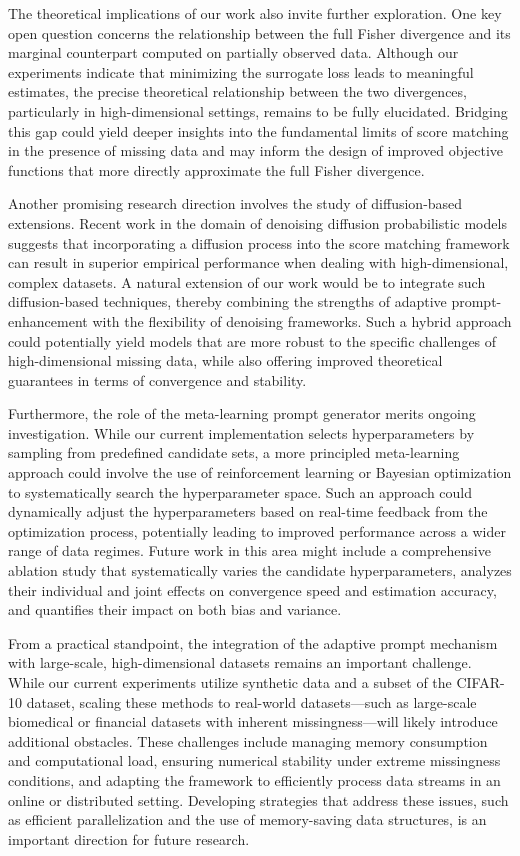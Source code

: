 \documentclass{article} %
\begin{document}
The theoretical implications of our work also invite further exploration. One key open question concerns the relationship between the full Fisher divergence and its marginal counterpart computed on partially observed data. Although our experiments indicate that minimizing the surrogate loss leads to meaningful estimates, the precise theoretical relationship between the two divergences, particularly in high-dimensional settings, remains to be fully elucidated. Bridging this gap could yield deeper insights into the fundamental limits of score matching in the presence of missing data and may inform the design of improved objective functions that more directly approximate the full Fisher divergence.

Another promising research direction involves the study of diffusion-based extensions. Recent work in the domain of denoising diffusion probabilistic models suggests that incorporating a diffusion process into the score matching framework can result in superior empirical performance when dealing with high-dimensional, complex datasets. A natural extension of our work would be to integrate such diffusion-based techniques, thereby combining the strengths of adaptive prompt-enhancement with the flexibility of denoising frameworks. Such a hybrid approach could potentially yield models that are more robust to the specific challenges of high-dimensional missing data, while also offering improved theoretical guarantees in terms of convergence and stability.

Furthermore, the role of the meta-learning prompt generator merits ongoing investigation. While our current implementation selects hyperparameters by sampling from predefined candidate sets, a more principled meta-learning approach could involve the use of reinforcement learning or Bayesian optimization to systematically search the hyperparameter space. Such an approach could dynamically adjust the hyperparameters based on real-time feedback from the optimization process, potentially leading to improved performance across a wider range of data regimes. Future work in this area might include a comprehensive ablation study that systematically varies the candidate hyperparameters, analyzes their individual and joint effects on convergence speed and estimation accuracy, and quantifies their impact on both bias and variance.

From a practical standpoint, the integration of the adaptive prompt mechanism with large-scale, high-dimensional datasets remains an important challenge. While our current experiments utilize synthetic data and a subset of the CIFAR-10 dataset, scaling these methods to real-world datasets—such as large-scale biomedical or financial datasets with inherent missingness—will likely introduce additional obstacles. These challenges include managing memory consumption and computational load, ensuring numerical stability under extreme missingness conditions, and adapting the framework to efficiently process data streams in an online or distributed setting. Developing strategies that address these issues, such as efficient parallelization and the use of memory-saving data structures, is an important direction for future research.
\end{document}
